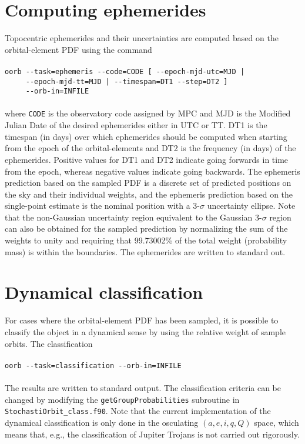 \documentclass[12pt,english,twoside,a4paper]{report}
\begin{document}
\section{Computing ephemerides}

Topocentric ephemerides and their uncertainties are computed based on
the orbital-element PDF using the command \\ \\
\verb+oorb --task=ephemeris --code=CODE [ --epoch-mjd-utc=MJD |+\\
\verb+     --epoch-mjd-tt=MJD | --timespan=DT1 --step=DT2 ]+\\
\verb+     --orb-in=INFILE+\\ \\
where \verb|CODE| is the observatory code assigned by MPC and MJD is
the Modified Julian Date of the desired ephemerides either in UTC or
TT. DT1 is the timespan (in days) over which ephemerides should be
computed when starting from the epoch of the orbital-elements and DT2
is the frequency (in days) of the ephemerides. Positive values for DT1
and DT2 indicate going forwards in time from the epoch, whereas
negative values indicate going backwards. The ephemeris prediction
based on the sampled PDF is a discrete set of predicted positions
on the sky and their individual weights, and the ephemeris prediction
based on the single-point estimate is the nominal position with a
3-$\sigma$ uncertainty ellipse. Note that the non-Gaussian uncertainty
region equivalent to the Gaussian 3-$\sigma$ region can also be
obtained for the sampled prediction by normalizing the sum of the
weights to unity and requiring that 99.73002\% of the total weight
(probability mass) is within the boundaries. The ephemerides are
written to standard out.

\section{Dynamical classification}

For cases where the orbital-element PDF has been sampled, it is
possible to classify the object in a dynamical sense by using the
relative weight of sample orbits. The classification
\\ \\ \verb|oorb --task=classification --orb-in=INFILE| \\ \\ The
results are written to standard output.  The classification criteria
can be changed by modifying the \verb|getGroupProbabilities|
subroutine in \\ \verb|StochastiOrbit_class.f90|. Note that the
current implementation of the dynamical classification is only done in
the osculating $(a,e,i,q,Q)$ space, which means that, e.g., the
classification of Jupiter Trojans is not carried out rigorously.
\end{document}
